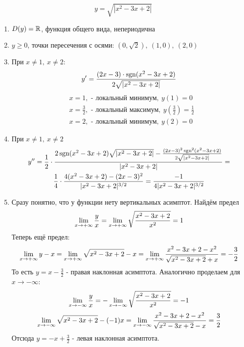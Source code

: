 \begin{example}
	\[
		y = \sqrt{|x^2 - 3x + 2|}
	\]
	\begin{enumerate}
		\item $D(y) = \mathbb{R}$, функция общего вида, непериодична
		
		\item $y \ge 0$, точки пересечения с осями: $(0, \sqrt{2}),\ (1, 0),\ (2, 0)$
		
		\item При $x \neq 1,\ x \neq 2$:
		\[
			y' = \frac{(2x - 3) \cdot \operatorname{sgn} (x^2 - 3x + 2)}{2 \sqrt{|x^2 - 3x + 2|}}
		\]
		\begin{align*}
			&{x = 1, \text{ - локальный минимум},\ y(1) = 0}
			\\
			&{x = \frac{3}{2}, \text{ - локальный максимум},\ y\left(\frac{3}{2}\right) = \frac{1}{2}}
			\\
			&{x = 2, \text{ - локальный минимум},\ y(2) = 0}
		\end{align*}
		\item При $x \neq 1,\ x \neq 2$
		\begin{multline*}
			y'' = \frac{1}{2} \cdot \frac{2 \operatorname{sgn} (x^2 - 3x + 2) \sqrt{|x^2 - 3x + 2|} - \frac{(2x - 3)^2 \operatorname{sgn}^2 (x^2 - 3x + 2)}{2 \sqrt{|x^2 - 3x + 2|}}}{|x^2 - 3x + 2|} =
			\\
			\frac{1}{4} \cdot \frac{4(x^2 - 3x + 2) - (2x - 3)^2}{|x^2 - 3x + 2|^{3/2}} = \frac{-1}{4|x^2 - 3x + 2|^{3/2}}
		\end{multline*}
		
		\item Сразу понятно, что у функции нету вертикальных асимптот. Найдём предел
		\[
			\lim\limits_{x \to +\infty} \frac{y}{x} = \lim\limits_{x \to +\infty} \sqrt{\frac{x^2 - 3x + 2}{x^2}} = 1
		\]
		Теперь ещё предел:
		\[
			\lim\limits_{x \to +\infty} y - x = \lim\limits_{x \to +\infty} \sqrt{x^2 - 3x + 2} - x = \lim\limits_{x \to +\infty} \frac{x^2 - 3x + 2 - x^2}{\sqrt{x^2 - 3x + 2} + x} = -\frac{3}{2}
		\]
		То есть $y = x - \frac{3}{2}$ - правая наклонная асимптота.
		Аналогично проделаем для $x \to -\infty$:
		\[
			\lim\limits_{x \to -\infty} \frac{y}{x} = -\lim\limits_{x \to -\infty} \sqrt{\frac{x^2 - 3x + 2}{x^2}} = -1
		\]
		\[
			\lim\limits_{x \to -\infty} \sqrt{x^2 - 3x + 2} - (-1)x = \lim\limits_{x \to -\infty} \frac{x^2 - 3x + 2 - x^2}{\sqrt{x^2 - 3x + 2} - x} = \frac{3}{2}
		\]
		Отсюда $y = -x + \frac{3}{2}$ - левая наклонная асимптота.
		
	\end{enumerate}
\end{example}